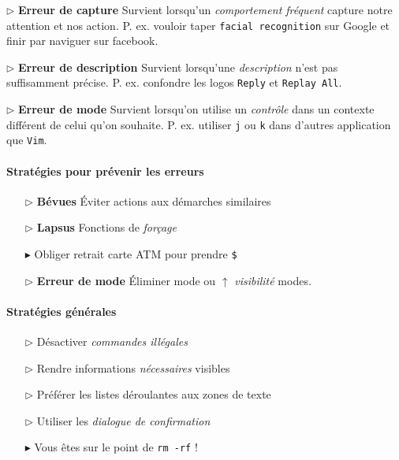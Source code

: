 \documentclass{report}
\begin{document}
\begin{multicols*}{3}

    \noindent $\rhd$ \textbf{Erreur de capture} Survient 
    lorsqu'un \textit{comportement fréquent} capture notre attention et 
    nos action. P. ex. vouloir taper \texttt{facial recognition} sur 
    Google et finir par naviguer sur facebook. 


    \noindent $\rhd$ \textbf{Erreur de description} Survient 
    lorsqu'une \textit{description} n'est pas suffisamment précise. 
    P. ex. confondre les logos \texttt{Reply} et \texttt{Replay All}.    


    \noindent $\rhd$ \textbf{Erreur de mode} Survient 
    lorsqu'on utilise un \textit{contrôle} dans un contexte 
    différent de celui qu'on souhaite. P. ex. utiliser 
    \texttt{j} ou \texttt{k} dans d'autres application que \texttt{Vim}.

    \paragraph{Stratégies pour prévenir les erreurs}
    \begin{itemize}
      \item [$\rhd$ ] \textbf{Bévues }  Éviter actions aux démarches similaires
      \item [$\rhd$ ] \textbf{Lapsus} Fonctions de \textit{forçage}   
      \item [$\blacktriangleright$ ]  Obliger retrait carte ATM 
        pour prendre \texttt{\$}  
      \item [$\rhd$ ] \textbf{Erreur de mode} Éliminer mode 
        ou $\uparrow$ \textit{visibilité} modes.   
    \end{itemize}

    \paragraph{Stratégies générales}
    \begin{itemize}
      \item [$\rhd$ ] Désactiver \textit{commandes illégales}  
      \item [$\rhd$ ] Rendre informations \textit{nécessaires} visibles  
      \item [$\rhd$ ] Préférer les listes déroulantes aux zones de texte 
      \item [$\rhd$ ] Utiliser les \textit{dialogue de confirmation}  
      \item [$\blacktriangleright$ ] Vous êtes sur le point de \texttt{rm -rf} !    
    \end{itemize}


\end{multicols*}
\end{document}
